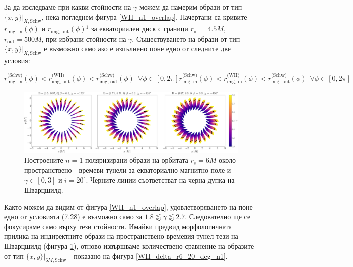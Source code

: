 За да изследваме при какви стойности на $\gamma$ можем да намерим образи от тип $\{x,y\}\vert_{X, \text{Schw}}$, нека погледнем фигура \ref{WH_n1_overlap}. Начертани са кривите $r_\text{img, in}(\phi)$ и $r_\text{img, out}(\phi)$$^1$ за екваториален диск с граници $r_\text{in} = 4.5M$, $r_\text{out} = 500M$, при избрани стойности на $\gamma$. Съществуването на образи от тип $\{x,y\}\vert_{X, \text{Schw}}$ е възможно само ако е изпълнено поне едно от следните две условия:


\begin{subequations}
	\begin{equation}
		r_\text{img, in}^{\text{(Schw)}}(\phi) < r_\text{img, out}^{\text{(WH)}}(\phi) < r_\text{img, out}^{\text{(Schw)}}(\phi)\,\,\, \forall\phi\in[0,2\pi]
	\end{equation}
	\begin{equation}
		r_\text{img, in}^{\text{(Schw)}}(\phi) < r_\text{img, in}^{\text{(WH)}}(\phi) < r_\text{img, out}^{\text{(Schw)}}(\phi)\,\,\, \forall\phi\in[0,2\pi]
	\end{equation}
\end{subequations}
\newpage
\begin{figure}[!htb]
	\hspace{-0.5cm}
	\includegraphics[scale = 0.15]{WH_alpha_Eq_Field_n1.png}
	\caption[Поляризирани $n=1$ образи около пространствено - времеви тунели за екваториално магнитно поле.]{\small Построените $n=1$ поляризирани образи на орбитата $r_s = 6M$ около пространствено - времеви тунели за екваториално магнитно поле и $\gamma \in[0,3]$ и $i = 20^\circ$. Черните линии съответстват на черна дупка на Шварцшилд.} 
	\label{WH_pol_eq_field_n1}
\end{figure}

\lfoot{}
Както можем да видим от фигура \ref{WH_n1_overlap}, удовлетворяването на поне едно от условията (7.28) е възможно само за  $1.8 \lessapprox \gamma \lessapprox 2.7$. Следователно ще се фокусираме само върху тези стойности. Имайки предвид морфологичната прилика на индиректните образи на пространствено-времевия тунел тези на Шварцшилд (фигура \ref{WH_pol_eq_field_n1}), отново извършваме количествено сравнение на образите от тип $\{x,y\}\vert_{6M, \text{Schw}}$ - показано на фигура \ref{WH_delta_r6_20_deg_n1}.\\

